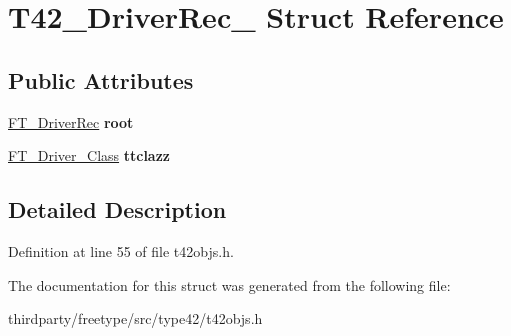 \hypertarget{struct_t42___driver_rec__}{}\section{T42\+\_\+\+Driver\+Rec\+\_\+ Struct Reference}
\label{struct_t42___driver_rec__}
\subsection*{Public Attributes}
\begin{DoxyCompactItemize}
\item 
\mbox{\label{struct_t42___driver_rec___a80f24e9e8a78b6b13551908b23b7e0bb}} 
\hyperlink{struct_f_t___driver_rec__}{F\+T\+\_\+\+Driver\+Rec} {\bfseries root}
\item 
\mbox{\label{struct_t42___driver_rec___af1663e82615b5216d74005e46f8b88dd}} 
\hyperlink{struct_f_t___driver___class_rec__}{F\+T\+\_\+\+Driver\+\_\+\+Class} {\bfseries ttclazz}
\end{DoxyCompactItemize}


\subsection{Detailed Description}


Definition at line 55 of file t42objs.\+h.



The documentation for this struct was generated from the following file\+:\begin{DoxyCompactItemize}
\item 
thirdparty/freetype/src/type42/t42objs.\+h\end{DoxyCompactItemize}
